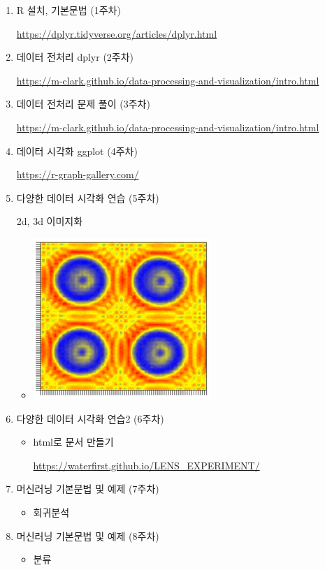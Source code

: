 \documentclass[
  letterpaper,
  DIV=11,
  numbers=noendperiod]{scrartcl}
\providecommand{\tightlist}{%
  \setlength{\itemsep}{0pt}\setlength{\parskip}{0pt}}\usepackage{longtable,booktabs,array}
\begin{document}
\begin{enumerate}
\def\labelenumi{\arabic{enumi}.}
\item
  R 설치, 기본문법 (1주차)

  \url{https://dplyr.tidyverse.org/articles/dplyr.html}
\item
  데이터 전처리 dplyr (2주차)

  \url{https://m-clark.github.io/data-processing-and-visualization/intro.html}
\item
  데이터 전처리 문제 풀이 (3주차)

  \url{https://m-clark.github.io/data-processing-and-visualization/intro.html}
\item
  데이터 시각화 ggplot (4주차)

  \url{https://r-graph-gallery.com/}
\item
  다양한 데이터 시각화 연습 (5주차)

  2d, 3d 이미지화

  \begin{itemize}
  \tightlist
  \item
    \includegraphics{images/logo1.png}
  \end{itemize}
\item
  다양한 데이터 시각화 연습2 (6주차)

  \begin{itemize}
  \item
    html로 문서 만들기

    \url{https://waterfirst.github.io/LENS_EXPERIMENT/}
  \end{itemize}
\item
  머신러닝 기본문법 및 예제 (7주차)

  \begin{itemize}
  \tightlist
  \item
    회귀분석
  \end{itemize}
\item
  머신러닝 기본문법 및 예제 (8주차)

  \begin{itemize}
  \tightlist
  \item
    분류
  \end{itemize}
\end{enumerate}
\end{document}
